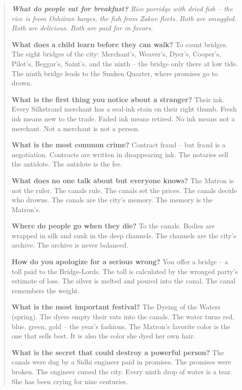 \documentclass[12pt,oneside]{book}
\newenvironment{almanac}
  {\begin{quote}\small\itshape}
  {\end{quote}}
\begin{document}
\begin{almanac}
\textbf{What do people eat for breakfast?} Rice porridge with dried fish -- the rice is from Oshiiran barges, the fish from Zakov fleets. Both are smuggled. Both are delicious. Both are paid for in favors.

\textbf{What does a child learn before they can walk?} To count bridges. The eight bridges of the city: Merchant's, Weaver's, Dyer's, Cooper's, Pilot's, Beggar's, Saint's, and the ninth -- the bridge only there at low tide. The ninth bridge leads to the Sunken Quarter, where promises go to drown.

\textbf{What is the first thing you notice about a stranger?} Their ink. Every Silkstrand merchant has a seal-ink stain on their right thumb. Fresh ink means new to the trade. Faded ink means retired. No ink means not a merchant. Not a merchant is not a person.

\textbf{What is the most common crime?} Contract fraud -- but fraud is a negotiation. Contracts are written in disappearing ink. The notaries sell the antidote. The antidote is the fee.

\textbf{What does no one talk about but everyone knows?} The Matron is not the ruler. The canals rule. The canals set the prices. The canals decide who drowns. The canals are the city's memory. The memory is the Matron's.

\textbf{Where do people go when they die?} To the canals. Bodies are wrapped in silk and sunk in the deep channels. The channels are the city's archive. The archive is never balanced.

\textbf{How do you apologize for a serious wrong?} You offer a bridge -- a toll paid to the Bridge-Lords. The toll is calculated by the wronged party's estimate of loss. The silver is melted and poured into the canal. The canal remembers the weight.

\textbf{What is the most important festival?} The Dyeing of the Waters (spring). The dyers empty their vats into the canals. The water turns red, blue, green, gold -- the year's fashions. The Matron's favorite color is the one that sells best. It is also the color she dyed her own hair.

\textbf{What is the secret that could destroy a powerful person?} The canals were dug by a Sidhi engineer paid in promises. The promises were broken. The engineer cursed the city. Every ninth drop of water is a tear. She has been crying for nine centuries.
\end{almanac}
\end{document}
